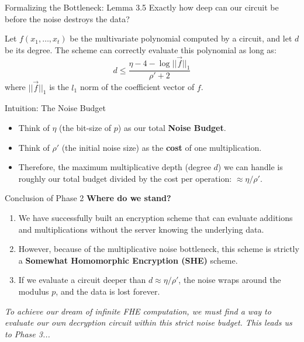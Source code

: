 \documentclass[10pt, aspectratio=169]{beamer}
\begin{document}
\begin{frame}{Formalizing the Bottleneck: Lemma 3.5}
    Exactly how deep can our circuit be before the noise destroys the data?
    \pause
    
    \begin{lemma}
    Let $f(x_1, \dots, x_t)$ be the multivariate polynomial computed by a circuit, and let $d$ be its degree. The scheme can correctly evaluate this polynomial as long as:
    $$d \le \frac{\eta - 4 - \log||\vec{f}||_1}{\rho' + 2}$$
    where $||\vec{f}||_1$ is the $l_1$ norm of the coefficient vector of $f$.
    \end{lemma}
    \pause
    
    \begin{block}{Intuition: The Noise Budget}
    \begin{itemize}
        \item Think of $\eta$ (the bit-size of $p$) as our total \textbf{Noise Budget}.
        \item Think of $\rho'$ (the initial noise size) as the \textbf{cost} of one multiplication.
        \item Therefore, the maximum multiplicative depth (degree $d$) we can handle is roughly our total budget divided by the cost per operation: $\approx \eta / \rho'$.
    \end{itemize}
    \end{block}
\end{frame}

\begin{frame}{Conclusion of Phase 2}
    \textbf{Where do we stand?}
    \pause
    
    \begin{enumerate}
        \item We have successfully built an encryption scheme that can evaluate additions and multiplications without the server knowing the underlying data.
        \pause
        \item However, because of the multiplicative noise bottleneck, this scheme is strictly a \textbf{Somewhat Homomorphic Encryption (SHE)} scheme.
        \pause
        \item If we evaluate a circuit deeper than $d \approx \eta / \rho'$, the noise wraps around the modulus $p$, and the data is lost forever.
    \end{enumerate}
    \pause
    
    \vspace{0.5cm}
    \begin{center}
        \textit{To achieve our dream of infinite FHE computation, we must find a way to evaluate our own decryption circuit within this strict noise budget. This leads us to Phase 3...}
    \end{center}
\end{frame}
\end{document}
